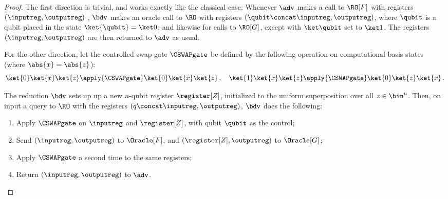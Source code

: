     \begin{proof}
      The first direction is trivial, and works exactly like the classical case: Whenever
        $\adv$ makes a call to $\RO[F]$ with registers
        $(\inputreg,\outputreg)$ , $\bdv$ makes an oracle call to $\RO$
        with registers $(\qubit \concat \inputreg, \outputreg)$, 
        where $\qubit$ is a qubit placed in the state $\ket{\qubit} = \ket 0$; and likewise
        for calls to $\RO[G]$, except with $\ket \qubit$ set to $\ket 1$. The
        registers $(\inputreg,\outputreg)$ are then returned to $\adv$ as usual.

      For the other direction, let the controlled swap gate $\CSWAPgate$ be
        defined by the following operation on computational basis states
        (where $\abs{x} = \abs{z}$):
      \[
        \ket{0}\ket{x}\ket{z} \apply{\CSWAPgate} \ket{0}\ket{x}\ket{z}\, , \quad
        \ket{1}\ket{x}\ket{z} \apply{\CSWAPgate} \ket{0}\ket{z}\ket{x}\, .
      \]

      \noindent
      The reduction $\bdv$ sets up up a new $n$-qubit register
        $\register[Z]$, initialized to the uniform superposition over all
        $z \in \bin^n$. Then, on input a query to $\RO$ with the registers $(q
        \concat \inputreg, \outputreg)$, $\bdv$ does the following: 
        \begin{enumerate}
          \item Apply $\CSWAPgate$ on $\inputreg$ and $\register[Z]$, with qubit
            $\qubit$ as the control;
          \item Send $(\inputreg, \outputreg)$ to $\Oracle[F]$, and
            $(\register[Z], \outputreg)$ to $\Oracle[G]$;
          \item Apply $\CSWAPgate$ a second time to the same registers;
          \item Return $(\inputreg, \outputreg)$ to $\adv$. 
        \end{enumerate}


\end{proof}
